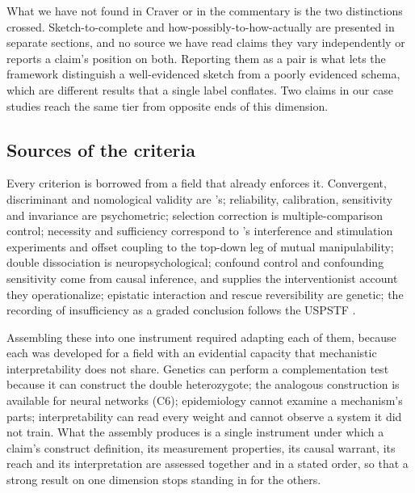 \documentclass{article}
\begin{document}
What we have not found in Craver or in the commentary is the two distinctions crossed. Sketch-to-complete and how-possibly-to-how-actually are presented in separate sections, and no source we have read claims they vary independently or reports a claim's position on both. Reporting them as a pair is what lets the framework distinguish a well-evidenced sketch from a poorly evidenced schema, which are different results that a single label conflates. Two claims in our case studies reach the same tier from opposite ends of this dimension.

\subsection{Sources of the criteria}
\label{sec:related-sources}

Every criterion is borrowed from a field that already enforces it. Convergent, discriminant and nomological validity are \citeauthor{cronbach1955construct}'s; reliability, calibration, sensitivity and invariance are psychometric; selection correction is multiple-comparison control; necessity and sufficiency correspond to \citeauthor{craver2007explaining}'s interference and stimulation experiments and offset coupling to the top-down leg of mutual manipulability; double dissociation is neuropsychological; confound control and confounding sensitivity come from causal inference, and \citet{woodward2003making} supplies the interventionist account they operationalize; epistatic interaction and rescue reversibility are genetic; the recording of insufficiency as a graded conclusion follows the USPSTF \citep{uspstf2021}.

Assembling these into one instrument required adapting each of them, because each was developed for a field with an evidential capacity that mechanistic interpretability does not share. Genetics can perform a complementation test \citep{benzer1955fine} because it can construct the double heterozygote; the analogous construction is available for neural networks (C6); epidemiology cannot examine a mechanism's parts; interpretability can read every weight and cannot observe a system it did not train. What the assembly produces is a single instrument under which a claim's construct definition, its measurement properties, its causal warrant, its reach and its interpretation are assessed together and in a stated order, so that a strong result on one dimension stops standing in for the others.
\end{document}

